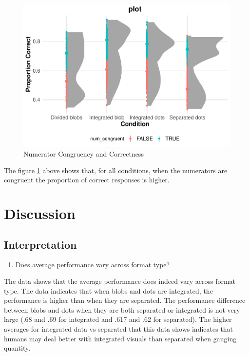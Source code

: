 \documentclass[
  man,floatsintext]{apa6}
\providecommand{\tightlist}{%
  \setlength{\itemsep}{0pt}\setlength{\parskip}{0pt}}
\begin{document}
\begin{figure}
\centering
\includegraphics{Choudhary_WA11_files/figure-latex/num-con-1.pdf}
\caption{\label{fig:num-con}Numerator Congruency and Correctness}
\end{figure}

The figure \ref{fig:num-con} above shows that, for all conditions, when the numerators are congruent the proportion of correct responses is higher.

\section{Discussion}\label{discussion}

\subsection{Interpretation}\label{interpretation}

\begin{enumerate}
\def\labelenumi{\arabic{enumi}.}
\tightlist
\item
  Does average performance vary across format type?
\end{enumerate}

The data shows that the average performance does indeed vary across format type. The data indicates that when blobs and dots are integrated, the performance is higher than when they are separated. The performance difference between blobs and dots when they are both separated or integrated is not very large (.68 and .69 for integrated and .617 and .62 for separated). The higher averages for integrated data vs separated that this data shows indicates that humans may deal better with integrated visuals than separated when gauging quantity.
\end{document}
